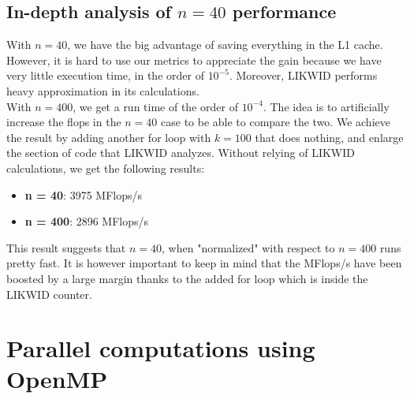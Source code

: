 \documentclass[11pt,a4paper,oneside,titlepage,openright]{book}
\begin{document}
\section{In-depth analysis of $n = 40$ performance}

With $ n = 40$, we have the big advantage of saving everything in the L1 cache. However, it is hard to use our metrics to appreciate the gain because we have very little execution time, in the order of $10^{-5}$. Moreover, LIKWID performs heavy approximation in its calculations. \\
With $n= 400$, we get a run time of the order of $10^{-4}$. 
The idea is to artificially increase the flops in the $n=40$ case to be able to compare the two. We achieve the result by adding another for loop with $k=100$ that does nothing, and enlarge the section of code that LIKWID analyzes. 
Without relying of LIKWID calculations, we get the following results: 
\begin{itemize}
\item \textbf{ n = 40}: 3975 MFlops/s
\item \textbf{ n = 400}: 2896 MFlops/s
\end{itemize}

This result suggests that $n = 40$, when "normalized" with respect to $n = 400$ runs pretty fast. It is however important to keep in mind that the MFlops/s have been boosted by a large margin thanks to the added for loop which is inside the LIKWID counter.


\chapter{Parallel computations using OpenMP}
\end{document}
